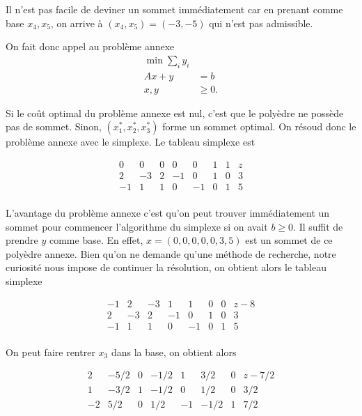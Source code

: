 \begin{enumerate}
\begin{solution}
      Il n'est pas facile de deviner un sommet immédiatement car en
      prenant comme base $x_4,x_5$, on arrive à $(x_4,x_5)=(-3,-5)$
      qui n'est pas admissible.

      On fait donc appel au problème annexe
      \begin{align*}
        \min \sum_i y_i\\
        Ax + y & = b\\
        x,y & \geq 0.
      \end{align*}

      Si le coût optimal du problème annexe est nul,
      c'est que le polyèdre ne possède pas de sommet.
      Sinon, $(x_1^*, x_2^*, x_3^*)$ forme un sommet optimal.
      On résoud donc le problème annexe avec le simplexe.
      Le tableau simplexe est

      \[
        \begin{array}{ccccccc|l}
           0 &  0 & 0 &  0 &  0 & 1 & 1 & z\\
          \hline
           2 & -3 & 2 & -1 &  0 & 1 & 0 & 3\\
          -1 &  1 & 1 &  0 & -1 & 0 & 1 & 5\\
        \end{array}
      \]

      L'avantage du problème annexe c'est qu'on peut trouver immédiatement
      un sommet pour commencer l'algorithme du simplexe
      si on avait $b \geq 0$.
      Il suffit de prendre $y$ comme base.
      En effet, $x = (0,0,0,0,0,3,5)$ est un sommet de ce polyèdre annexe.
      Bien qu'on ne demande qu'une méthode de recherche,
      notre curiosité nous impose de continuer la résolution,
      on obtient alors le tableau simplexe

      \[
        \begin{array}{ccccccc|l}
          -1 &  2 & -3 &  1 &  1 & 0 & 0 & z-8\\
          \hline
           2 & -3 &  2 & -1 &  0 & 1 & 0 & 3\\
          -1 &  1 &  1 &  0 & -1 & 0 & 1 & 5\\
        \end{array}
      \]

      On peut faire rentrer $x_3$ dans la base,
      on obtient alors

      \[
        \begin{array}{ccccccc|l}
           2 & -5/2 &  0 & -1/2 &  1 &  3/2 & 0 & z-7/2\\
          \hline
           1 & -3/2 &  1 & -1/2 &  0 &  1/2 & 0 & 3/2\\
          -2 &  5/2 &  0 &  1/2 & -1 & -1/2 & 1 & 7/2\\
        \end{array}
      \]


\end{solution}
\end{enumerate}
